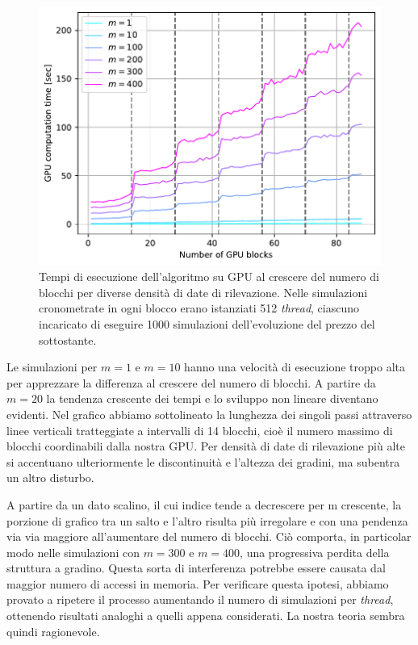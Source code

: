 \begin{figure}[t]
    \centering
    \includegraphics[scale=0.5]{graphs/ComputationTime_Tesla_GPUTimeVsNOfBlocks_VariousM_1000SimsPerThread.pdf}
    \caption{Tempi di esecuzione dell'algoritmo su GPU al crescere del numero di blocchi per diverse densità di date di rilevazione. Nelle simulazioni cronometrate in ogni blocco erano istanziati 512 \textit{thread}, ciascuno incaricato di eseguire 1000 simulazioni dell'evoluzione del prezzo del sottostante.}
    \label{fig:gpucomptime}
\end{figure}


Le simulazioni per $m=1$ e $m=10$ hanno una velocità di esecuzione troppo alta per apprezzare la differenza al crescere del numero di blocchi. A partire da $m=20$ la tendenza crescente dei tempi e lo sviluppo non lineare diventano evidenti. Nel grafico abbiamo sottolineato la lunghezza dei singoli passi attraverso linee verticali tratteggiate a intervalli di 14 blocchi, cioè il numero massimo di blocchi coordinabili dalla nostra GPU. Per densità di date di rilevazione più alte si accentuano ulteriormente le discontinuità e l'altezza dei gradini, ma subentra un altro disturbo.

A partire da un dato scalino, il cui indice tende a decrescere per m crescente, la porzione di grafico tra un salto e l'altro risulta più irregolare e con una pendenza via via maggiore all'aumentare del numero di blocchi. Ciò comporta, in particolar modo nelle simulazioni con $m=300$ e $m=400$, una progressiva perdita della struttura a gradino. Questa sorta di interferenza potrebbe essere causata dal maggior numero di accessi in memoria. Per verificare questa ipotesi, abbiamo provato a ripetere il processo aumentando il numero di simulazioni per \textit{thread}, ottenendo risultati analoghi a quelli appena considerati. La nostra teoria sembra quindi ragionevole.

